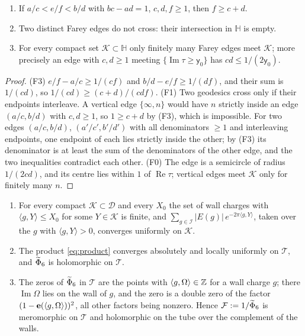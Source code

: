 \begin{lemma}\label{lem:farey}
\begin{enumerate}
\item[(F3)] If $a/c<e/f<b/d$ with $bc-ad=1$, $c,d,f\ge1$, then $f\ge c+d$.
\item[(F1)] Two distinct Farey edges do not cross: their intersection in $\mathbb H$ is empty.
\item[(F0)] For every compact set $\mathcal K\subset\mathbb H$ only finitely many Farey edges meet $\mathcal K$; more precisely an edge with $c,d\ge1$ meeting $\{\operatorname{Im}\tau\ge\mathsf y_0\}$ has $cd\le1/(2\mathsf y_0)$.
\end{enumerate}
\end{lemma}

\begin{proof}
(F3) $e/f-a/c\ge1/(cf)$ and $b/d-e/f\ge1/(df)$, and their sum is $1/(cd)$, so $1/(cd)\ge(c+d)/(cdf)$. (F1) Two geodesics cross only if their endpoints interleave. A vertical edge $\{\infty,n\}$ would have $n$ strictly inside an edge $(a/c,b/d)$ with $c,d\ge1$, so $1\ge c+d$ by (F3), which is impossible. For two edges $(a/c,b/d)$, $(a'/c',b'/d')$ with all denominators $\ge1$ and interleaving endpoints, one endpoint of each lies strictly inside the other; by (F3) its denominator is at least the sum of the denominators of the other edge, and the two inequalities contradict each other. (F0) The edge is a semicircle of radius $1/(2cd)$, and its centre lies within $1$ of $\operatorname{Re}\tau$; vertical edges meet $\mathcal K$ only for finitely many $n$.
\end{proof}

\begin{proposition}\label{prop:convergence}
\begin{enumerate}
\item[(i)] For every compact $\mathcal K\subset\mathcal D$ and every $X_0$ the set of wall charges with $\langle g,Y\rangle\le X_0$ for some $Y\in\mathcal K$ is finite, and $\sum_{g\in\mathcal I}|E(g)|\,e^{-2\pi\langle g,Y\rangle}$, taken over the $g$ with $\langle g,Y\rangle>0$, converges uniformly on $\mathcal K$.
\item[(ii)] The product \eqref{eq:product} converges absolutely and locally uniformly on $\mathcal T$, and $\widetilde\Phi_6$ is holomorphic on $\mathcal T$.
\item[(iii)] The zeros of $\widetilde\Phi_6$ in $\mathcal T$ are the points with $\langle g,\Omega\rangle\in\mathbb{Z}$ for a wall charge $g$; there $\operatorname{Im}\Omega$ lies on the wall of $g$, and the zero is a double zero of the factor $(1-\mathbf e(\langle g,\Omega\rangle))^2$, all other factors being nonzero. Hence $\mathcal F:=1/\widetilde\Phi_6$ is meromorphic on $\mathcal T$ and holomorphic on the tube over the complement of the walls.
\end{enumerate}
\end{proposition}

